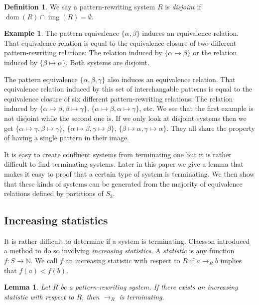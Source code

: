 \documentclass[a4paper, 11pt, english]{article}
\newcommand{\patternrule}{ \mapsto \!}
\newtheorem{lemma}[theorem]{Lemma}
\theoremstyle{definition}
\newtheorem{definition}[theorem]{Definition}
\newtheorem{example}[theorem]{Example}
\newcommand{\Sym}{S}
\DeclareMathOperator{\dom}{dom}
\DeclareMathOperator{\img}{img}
\begin{document}
\begin{definition}
  We say a pattern-rewriting system $R$ is \emph{disjoint} if $\dom(R) \cap \img(R) = \emptyset$.
\end{definition}

\begin{example}
  The pattern equivalence $\{ \alpha, \beta \}$ induces an equivalence relation.
  That equivalence relation is equal to the equivalence closure of two different pattern-rewriting
  relations: The relation induced by $\{ \alpha \patternrule \beta \}$ or the relation induced by
  $\{ \beta \patternrule \alpha \}$. Both systems are disjoint.

  The pattern equivalence $\{ \alpha, \beta, \gamma \}$ also induces an equivalence relation.
  That equivalence relation induced by this set of interchangable patterns is equal to the
  equivalence closure of six different pattern-rewriting
  relations: The relation induced by $\{ \alpha \patternrule \beta, \beta \patternrule \gamma \}$,
  $\{ \alpha \patternrule \beta, \alpha \patternrule \gamma \}$, etc. We see that the first example is
  not disjoint while the second one is. If we only look at disjoint systems then we get
  $\{ \alpha \patternrule \gamma, \beta \patternrule \gamma \}$,
  $\{ \alpha \patternrule \beta, \gamma \patternrule \beta \}$,
  $\{ \beta \patternrule \alpha, \gamma \patternrule \alpha \}$.
  They all share the property of having a single pattern in their image.
\end{example}

It is easy to create confluent systems from terminating one but it is rather difficult to find
terminating systems. Later in this paper we give a lemma that makes it easy to proof that a certain
type of system is terminating. We then show that these kinds of systems can be generated from  the
majority of equivalence relations defined by partitions of $\Sym_3$.

\subsection{Increasing statistics}
It is rather difficult to determine if a system is terminating. Claesson introduced a method to
do so involving \emph{increasing statistics}.
A \emph{statistic} is any function $f : \Sym \to \mathbb{N}$. We call $f$ an increasing
statistic with respect to $R$ if $a \to_R b$ implies that $f(a) < f(b)$.

\begin{lemma}
    Let $R$ be a pattern-rewriting system. If there exists an increasing
    statistic with respect to $R$, then $\to_R$ is terminating.    
\end{lemma}
\end{document}
